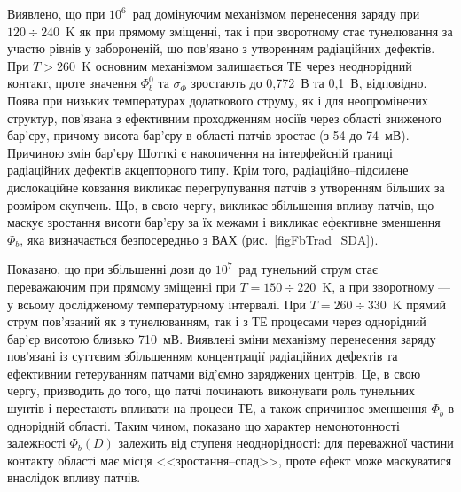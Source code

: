 Виявлено, що при $10^6$~рад домінуючим механізмом перенесення заряду при $120\div240$~K як при прямому зміщенні, так і при зворотному стає тунелювання за участю рівнів у забороненій, що пов'язано з утворенням радіаційних дефектів.
При $T>260$~K основним механізмом залишається ТЕ через неоднорідний контакт, проте значення $\Phi_b^0$ та $\sigma_{\Phi}$
зростають до 0,772~В та 0,1~В, відповідно.
Поява при низьких температурах додаткового струму, як і для неопромінених структур, пов'язана з ефективним проходженням носіїв через області зниженого бар'єру, причому висота бар'єру в області патчів зростає (з 54 до 74~мВ).
Причиною змін бар'єру Шотткі є накопичення на інтерфейсній границі радіаційних дефектів акцепторного типу.
Крім того, радіаційно--підсилене дислокаційне ковзання викликає  перегрупування патчів з утворенням більших за розміром скупчень.
Що, в свою чергу, викликає збільшення впливу патчів, що  маскує зростання висоти бар'єру за їх межами і викликає ефективне зменшення $\Phi_b$, яка визначається безпосередньо з ВАХ (рис.~\ref{figFbTrad_SDA}).

Показано, що
при збільшенні дози до $10^7$~рад тунельний струм стає переважаючим
при прямому зміщенні при $T=150\div220$~K,
а при зворотному --- у всьому дослідженому температурному інтервалі.
При $T=260\div330$~K прямий струм пов'язаний як з тунелюванням, так і з ТЕ процесами через однорідний бар'єр висотою близько 710~мВ.
Виявлені зміни механізму перенесення заряду пов'язані із суттєвим збільшенням концентрації радіаційних дефектів та ефективним гетеруванням патчами від'ємно заряджених центрів.
Це, в свою чергу, призводить до того, що патчі починають виконувати роль тунельних шунтів і перестають впливати на процеси ТЕ, а також спричинює зменшення $\Phi_b$ в однорідній області.
Таким чином, показано що
характер немонотонності залежності $\Phi_b(D)$ залежить від ступеня неоднорідності:
для переважної частини контакту області має місця <<зростання--спад>>, проте ефект може маскуватися внаслідок впливу патчів.

